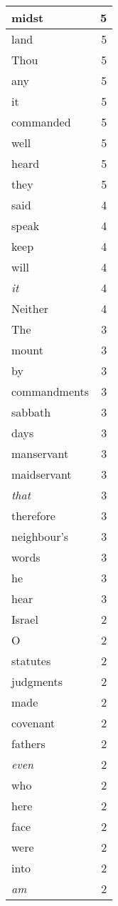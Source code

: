 \begin{center}
\begin{longtable}{l|r}
midst & 5 \\ \hline
land & 5 \\ \hline
Thou & 5 \\ \hline
any & 5 \\ \hline
it & 5 \\ \hline
commanded & 5 \\ \hline
well & 5 \\ \hline
heard & 5 \\ \hline
they & 5 \\ \hline
said & 4 \\ \hline
speak & 4 \\ \hline
keep & 4 \\ \hline
will & 4 \\ \hline
\emph{it} & 4 \\ \hline
Neither & 4 \\ \hline
The & 3 \\ \hline
mount & 3 \\ \hline
by & 3 \\ \hline
commandments & 3 \\ \hline
sabbath & 3 \\ \hline
days & 3 \\ \hline
manservant & 3 \\ \hline
maidservant & 3 \\ \hline
\emph{that} & 3 \\ \hline
therefore & 3 \\ \hline
neighbour's & 3 \\ \hline
words & 3 \\ \hline
he & 3 \\ \hline
hear & 3 \\ \hline
Israel & 2 \\ \hline
O & 2 \\ \hline
statutes & 2 \\ \hline
judgments & 2 \\ \hline
made & 2 \\ \hline
covenant & 2 \\ \hline
fathers & 2 \\ \hline
\emph{even} & 2 \\ \hline
who & 2 \\ \hline
here & 2 \\ \hline
face & 2 \\ \hline
were & 2 \\ \hline
into & 2 \\ \hline
\emph{am} & 2 \\ \hline

\end{longtable}
\end{center}
